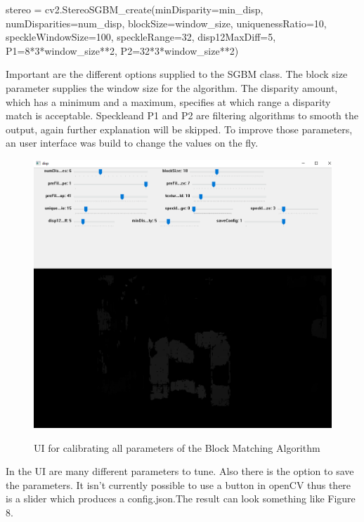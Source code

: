 \documentclass[journal,onecolumn]{IEEEtran}
\begin{document}
\begin{python}
stereo = cv2.StereoSGBM_create(minDisparity=min_disp,
			       numDisparities=num_disp,
			       blockSize=window_size,
			       uniquenessRatio=10,
			       speckleWindowSize=100,
			       speckleRange=32,
			       disp12MaxDiff=5,
			       P1=8*3*window_size**2,
			       P2=32*3*window_size**2)
\end{python}
Important are the different options supplied to the SGBM class. The block size parameter supplies the window size for the algorithm. The disparity amount, which has a minimum and a maximum, specifies at which range a disparity match is acceptable. Speckleand P1 and P2 are filtering algorithms to smooth the output\cite{stereoSGBM}, again further explanation will be skipped.
To improve those parameters, an user interface was build to change the values on the fly.
\begin{figure}[H]
	\centering
	\includegraphics[scale=0.5]{calibrateUI.png}
	\label{UI}
	\captionsetup{justification=centering}
	\caption{UI for calibrating all parameters of the Block Matching Algorithm}
\end{figure}
\noindent
In the UI are many different parameters to tune. Also there is the option to save the parameters. It isn't currently possible to use a button in openCV thus there is a slider which produces a config.json.The result can look something like Figure 8.
\end{document}
